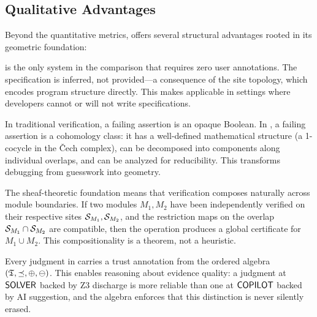 \subsection{Qualitative Advantages}\label{sec:qual-advantages}

Beyond the quantitative metrics, \JuGeo{} offers several structural
advantages rooted in its geometric foundation:

\begin{description}[leftmargin=1.5em,style=nextline]
\item[No annotation burden.]
  \JuGeo{} is the only system in the comparison that requires
  zero user annotations.  The specification is inferred, not
  provided---a consequence of the site topology, which encodes
  program structure directly.  This makes \JuGeo{} applicable in
  settings where developers cannot or will not write specifications.

\item[Geometric insight.]
  In traditional verification, a failing assertion is an opaque
  Boolean.  In \JuGeo{}, a failing assertion is a cohomology class:
  it has a well-defined mathematical structure (a 1-cocycle in the
  \v{C}ech complex), can be decomposed into components along
  individual overlaps, and can be analyzed for reducibility.  This
  transforms debugging from guesswork into geometry.

\item[Composability.]
  The sheaf-theoretic foundation means that verification composes
  naturally across module boundaries.  If two modules $M_1, M_2$
  have been independently verified on their respective sites
  $\mathcal{S}_{M_1}, \mathcal{S}_{M_2}$, and the restriction maps on the overlap
  $\mathcal{S}_{M_1} \cap \mathcal{S}_{M_2}$ are compatible, then
  the \GLUE{} operation produces a global certificate for
  $M_1 \cup M_2$.  This compositionality is a theorem, not a
  heuristic.

\item[Trust-aware reasoning.]
  Every judgment in \JuGeo{} carries a trust annotation from the
  ordered algebra $(\mathfrak{T}, \preceq, \oplus, \ominus)$.
  This enables reasoning about evidence quality: a judgment at
  $\mathsf{SOLVER}$ backed by Z3 discharge is more reliable than one at
  $\mathsf{COPILOT}$ backed by AI suggestion, and the algebra enforces
  that this distinction is never silently erased.
\end{description}

